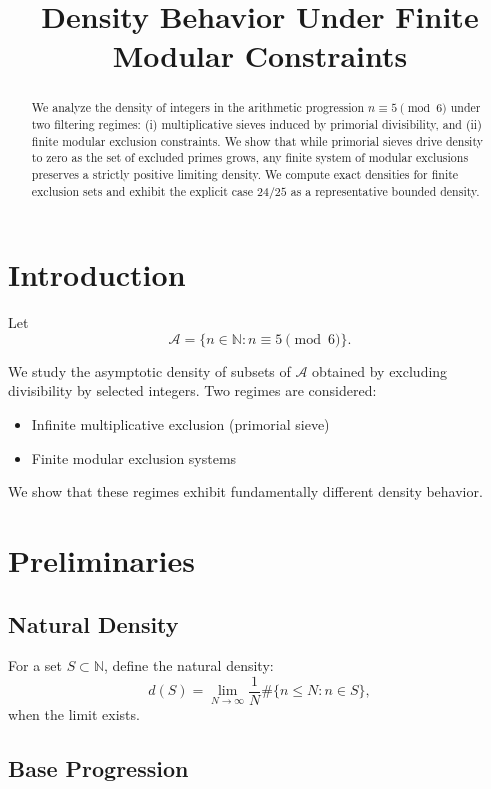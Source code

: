 \documentclass[11pt]{article}
\title{Density Behavior Under Finite Modular Constraints}
\author{}
\date{}
\theoremstyle{plain}
\begin{document}
\maketitle

\begin{abstract}
We analyze the density of integers in the arithmetic progression $n \equiv 5 \pmod{6}$ under two filtering regimes: (i) multiplicative sieves induced by primorial divisibility, and (ii) finite modular exclusion constraints. We show that while primorial sieves drive density to zero as the set of excluded primes grows, any finite system of modular exclusions preserves a strictly positive limiting density. We compute exact densities for finite exclusion sets and exhibit the explicit case $24/25$ as a representative bounded density.
\end{abstract}

\section{Introduction}

Let
\[
\mathcal{A} = \{ n \in \mathbb{N} : n \equiv 5 \pmod{6} \}.
\]

We study the asymptotic density of subsets of $\mathcal{A}$ obtained by excluding divisibility by selected integers. Two regimes are considered:

\begin{itemize}
    \item Infinite multiplicative exclusion (primorial sieve)
    \item Finite modular exclusion systems
\end{itemize}

We show that these regimes exhibit fundamentally different density behavior.

\section{Preliminaries}

\subsection{Natural Density}

For a set $S \subset \mathbb{N}$, define the natural density:
\[
d(S) = \lim_{N \to \infty} \frac{1}{N} \#\{ n \leq N : n \in S \},
\]
when the limit exists.

\subsection{Base Progression}
\end{document}
